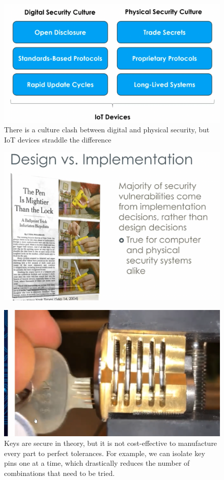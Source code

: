 \documentclass[../notes.tex]{subfiles}
\begin{document}
\begin{figure}[H]
    \centering
    \includegraphics[width=0.8\linewidth]{img/image_2023-04-16-20-54-47.png}
    \caption{There is a culture clash between digital and physical security, but IoT devices straddle the difference}
\end{figure}


\begin{figure}[H]
    \centering
    \includegraphics[width=0.8\linewidth]{img/image_2023-04-16-20-56-03.png}
\end{figure}


\begin{figure}[H]
    \centering
    \includegraphics[width=0.8\linewidth]{img/image_2023-04-16-20-57-18.png}
    \caption{Keys are secure in theory, but it is not cost-effective to manufacture every part to perfect tolerances. For example, we can isolate key pins one at a time, which drastically reduces the number of combinations that need to be tried.}
\end{figure}
\end{document}
